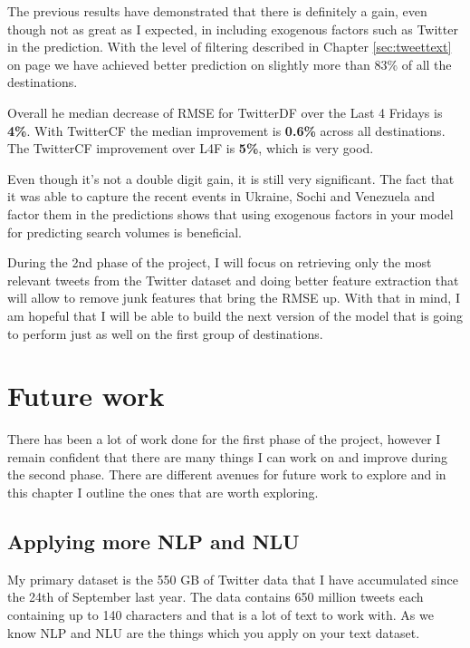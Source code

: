 \documentclass[minf,twoside,singlespacing,parskip,frontabs,notimes,11pt]{infthesis}
\begin{document}
The previous results have demonstrated that there is definitely a gain, even though not as great as I expected, in including exogenous factors such as Twitter in the prediction. With the level of filtering described in Chapter \ref{sec:tweettext} on page \pageref{sec:tweettext} we have achieved better prediction on slightly more than 83\% of all the destinations.  


Overall he median decrease of RMSE for TwitterDF over the Last 4 Fridays is \textbf{4\%}. With TwitterCF the median improvement is \textbf{0.6\%} across all destinations. The TwitterCF improvement over L4F is \textbf{5\%}, which is very good. 


Even though it's not a double digit gain, it is still very significant. The fact that it was able to capture the recent events in Ukraine, Sochi and Venezuela and factor them in the predictions shows that using exogenous factors in your model for predicting search volumes is beneficial.


During the 2nd phase of the project, I will focus on retrieving only the most relevant tweets from the Twitter dataset and doing better feature extraction that will allow to remove junk features that bring the RMSE up. With that in mind, I am hopeful that I will be able to build the next version of the model that is going to perform just as well on the first group of destinations. 




\chapter{Future work}
\label{chap:future-work}

There has been a lot of work done for the first phase of the project, however I remain confident that there are many things I can work on and improve during the second phase. There are different avenues for future work to explore and in this chapter I outline the ones that are worth exploring.

\section{Applying more NLP and NLU}


My primary dataset is the 550 GB of Twitter data that I have accumulated since the 24th of September last year. The data contains 650 million tweets each containing up to 140 characters and that is a lot of text to work with. As we know NLP and NLU are the things which you apply on your text dataset.
\end{document}
